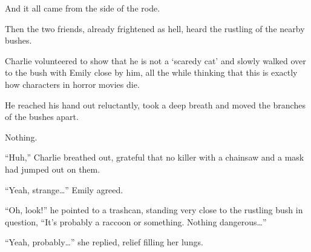 And it all came from the side of the rode.

Then the two friends, already frightened as hell, heard the rustling of the nearby bushes.

Charlie volunteered to show that he is not a ‘scaredy cat’ and slowly walked over to the bush with Emily close by him, all the while thinking that this is exactly how characters in horror movies die.

He reached his hand out reluctantly, took a deep breath and moved the branches of the bushes apart.

Nothing.

“Huh,” Charlie breathed out, grateful that no killer with a chainsaw and a mask had jumped out on them.

“Yeah, strange…” Emily agreed.

“Oh, look!” he pointed to a trashcan, standing very close to the rustling bush in question, “It’s probably a raccoon or something. Nothing dangerous…”

“Yeah, probably…” she replied, relief filling her lungs.